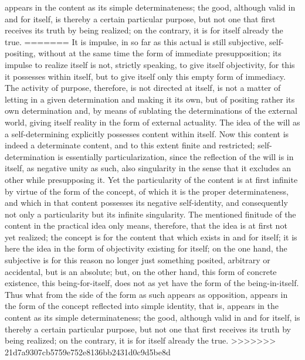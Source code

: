appears in the content as its simple determinateness; the good, although
valid in and for itself, is thereby a certain particular purpose, but not one
that first receives its truth by being realized; on the contrary, it is for itself
already the true.
=======
It is impulse, in so far as this actual is
still subjective, self-positing,
without at the same time the form of immediate presupposition;
its impulse to realize itself is not, strictly speaking,
to give itself objectivity,
for this it possesses within itself,
but to give itself only this empty form of immediacy.
The activity of purpose, therefore,
is not directed at itself,
is not a matter of letting in
a given determination
and making it its own,
but of positing rather its own determination
and, by means of sublating the determinations
of the external world,
giving itself reality in the form of external actuality.
The idea of the will as a self-determining
explicitly possesses content within itself.
Now this content is indeed a determinate content,
and to this extent finite and restricted;
self-determination is essentially particularization,
since the reflection of the will is in itself,
as negative unity as such, also singularity in the sense
that it excludes an other while presupposing it.
Yet the particularity of the content is
at first infinite by virtue of the form of the concept,
of which it is the proper determinateness,
and which in that content possesses
its negative self-identity,
and consequently not only a particularity
but its infinite singularity.
The mentioned finitude of the content in the practical
idea only means, therefore,
that the idea is at first not yet realized;
the concept is for the content
that which exists in and for itself;
it is here the idea in the form of
objectivity existing for itself;
on the one hand, the subjective is
for this reason no longer just something posited,
arbitrary or accidental, but is an absolute;
but, on the other hand, this form of concrete existence,
this being-for-itself,
does not as yet have the form of the being-in-itself.
Thus what from the side of
the form as such appears as opposition,
appears in the form of the concept
reflected into simple identity,
that is, appears in the content as its simple determinateness;
the good, although valid in and for itself,
is thereby a certain particular purpose,
but not one that first receives its truth by being realized;
on the contrary, it is for itself already the true.
>>>>>>> 21d7a9307cb5759e752e8136bb2431d0c9d5be8d

